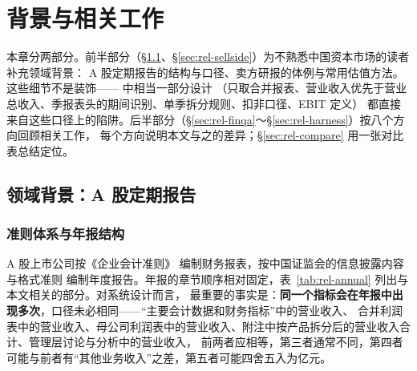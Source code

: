 \section{背景与相关工作}
\label{sec:related}

本章分两部分。前半部分（\S\ref{sec:rel-ashare}、\S\ref{sec:rel-sellside}）为不熟悉中国资本市场的读者补充领域背景：
A 股定期报告的结构与口径、卖方研报的体例与常用估值方法。这些细节不是装饰——\sysname{} 中相当一部分设计
（只取合并报表、营业收入优先于营业总收入、季报表头的期间识别、单季拆分规则、扣非口径、EBIT 定义）
都直接来自这些口径上的陷阱。后半部分（\S\ref{sec:rel-finqa}～\S\ref{sec:rel-harness}）按八个方向回顾相关工作，
每个方向说明本文与之的差异；\S\ref{sec:rel-compare} 用一张对比表总结定位。

\subsection{领域背景：A 股定期报告}
\label{sec:rel-ashare}

\subsubsection{准则体系与年报结构}
A 股上市公司按《企业会计准则》\cite{mof2006cas} 编制财务报表，按中国证监会的信息披露内容与格式准则\cite{csrc2021annual}
编制年度报告。年报的章节顺序相对固定，表~\ref{tab:rel-annual} 列出与本文相关的部分。对系统设计而言，
最重要的事实是：\textbf{同一个指标会在年报中出现多次}，口径未必相同——“主要会计数据和财务指标”中的营业收入、
合并利润表中的营业收入、母公司利润表中的营业收入、附注中按产品拆分后的营业收入合计、管理层讨论与分析中的营业收入，
前两者应相等，第三者通常不同，第四者可能与前者有“其他业务收入”之差，第五者可能四舍五入为亿元。

